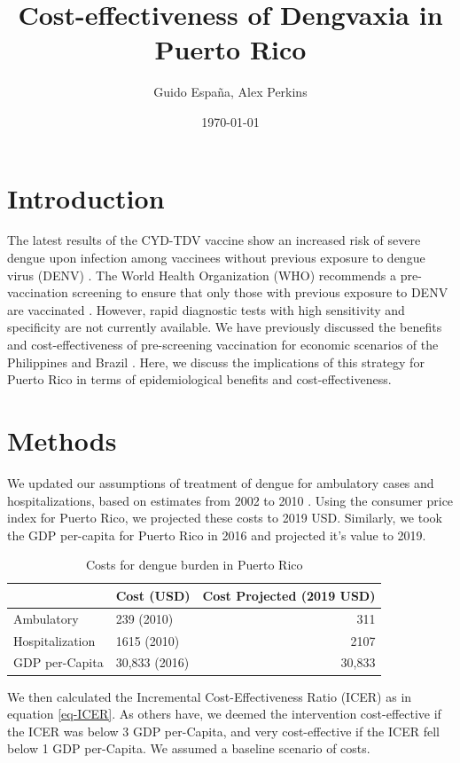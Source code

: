 \documentclass[12pt]{article}
\author{Guido España, Alex Perkins}
\date{\today}
\title{Cost-effectiveness of Dengvaxia in Puerto Rico}
\begin{document}
\maketitle

\section{Introduction}
The latest results of the CYD-TDV vaccine show an increased risk of severe dengue upon infection among vaccinees without previous exposure to dengue virus (DENV) \cite{Sridhar2018}. The World Health Organization (WHO) recommends a pre-vaccination screening to ensure that only those with previous exposure to DENV are vaccinated \cite{WHO2018}. However, rapid diagnostic tests with high sensitivity and specificity are not currently available. We have previously discussed the benefits and cost-effectiveness of pre-screening vaccination for economic scenarios of the Philippines and Brazil \cite{Espana2019Biorxiv}. Here, we discuss the implications of this strategy for Puerto Rico in terms of epidemiological benefits and cost-effectiveness. 

\section{Methods}
We updated our assumptions of treatment of dengue for ambulatory cases and hospitalizations, based on estimates from 2002 to 2010 \cite{Halasa2012}. Using the consumer price index for Puerto Rico, we projected these costs to 2019 USD. Similarly, we took the GDP per-capita for Puerto Rico in 2016 \cite{worldbank2016} and projected it's value to 2019. 

\begin{table}
  \begin{center}
    \begin{tabular}{|l|l|r|}
      \hline
      & Cost (USD) & Cost Projected (2019 USD)\\
      \hline
      Ambulatory & 239 (2010) & 311\\
      Hospitalization & 1615 (2010) & 2107\\
      GDP per-Capita & 30,833 (2016) & 30,833\\
      \hline
    \end{tabular}
  \end{center}
  \caption{Costs for dengue burden in Puerto Rico}
  \label{tbl-costs}
\end{table}

We then calculated the Incremental Cost-Effectiveness Ratio (ICER) as in equation \ref{eq-ICER}. As others have, we deemed the intervention cost-effective if the ICER was below 3 GDP per-Capita, and very cost-effective if the ICER fell below 1 GDP per-Capita. We assumed a baseline scenario of costs.
\end{document}
